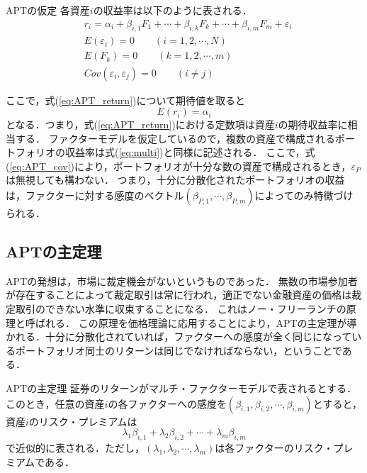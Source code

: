 ﻿\documentclass[11pt]{jreport}
\begin{document}
\begin{itembox}[l]{APTの仮定}
各資産$i$の収益率は以下のように表される．
\begin{eqnarray}
& r_i = \alpha_i + \beta_{i,1}F_1 + \cdots + \beta_{i,k}F_k + \cdots + \beta_{i,m}F_m + \varepsilon_i\label{eq:APT_return} \\
& E(\varepsilon_i) = 0 \qquad (i=1,2,\cdots,N)\\
& E(F_k) = 0 \qquad (k=1,2,\cdots,m)\\
& Cov(\varepsilon_i, \varepsilon_j) = 0 \qquad (i \neq j) \label{eq:APT_cov}
\end{eqnarray}
\end{itembox}
ここで，式(\ref{eq:APT_return})について期待値を取ると
\begin{equation}
E(r_i) = \alpha_i
\end{equation}
となる．つまり，式(\ref{eq:APT_return})における定数項は資産$i$の期待収益率に相当する．
ファクターモデルを仮定しているので，複数の資産で構成されるポートフォリオの収益率は式(\ref{eq:multi})と同様に記述される．
ここで，式(\ref{eq:APT_cov})により，ポートフォリオが十分な数の資産で構成されるとき，$\varepsilon_P$は無視しても構わない．
つまり，十分に分散化されたポートフォリオの収益は，ファクターに対する感度のベクトル$(\beta_{P,1},\cdots,\beta_{P,m})$によってのみ特徴づけられる．




\subsection{APTの主定理}
APTの発想は，市場に裁定機会がないというものであった．
無数の市場参加者が存在することによって裁定取引は常に行われ，適正でない金融資産の価格は裁定取引のできない水準に収束することになる．
これはノー・フリーランチの原理と呼ばれる．
この原理を価格理論に応用することにより，APTの主定理が導かれる．十分に分散化されていれば，ファクターへの感度が全く同じになっているポートフォリオ同士のリターンは同じでなければならない，ということである．

\begin{itembox}[l]{APTの主定理}
証券のリターンがマルチ・ファクターモデルで表されるとする．
このとき，任意の資産$i$の各ファクターへの感度を$(\beta_{i,1},\beta_{i,2},\cdots,\beta_{i,m})$とすると，資産$i$のリスク・プレミアムは
\begin{equation}
\lambda_1\beta_{i,1} + \lambda_2\beta_{i,2} + \cdots + \lambda_m\beta_{i,m}
\end{equation}
で近似的に表される．ただし，$( \lambda_1, \lambda_2, \cdots ,\lambda_m )$は各ファクターのリスク・プレミアムである．
\end{itembox}
\end{document}
